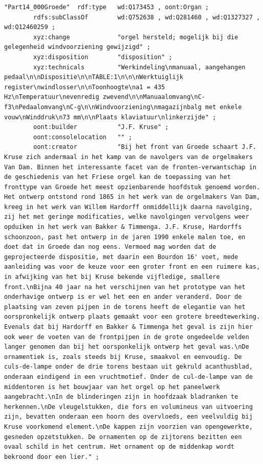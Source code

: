 \begin{lstlisting}[caption={Part14\_000Groede}]
"Part14_000Groede"  rdf:type   wd:Q173453 , oont:Organ ;
        rdfs:subClassOf        wd:Q752638 , wd:Q281460 , wd:Q1327327 , wd:Q12460259 ;
        xyz:change             "orgel hersteld; mogelijk bij die gelegenheid windvoorziening gewijzigd" ;
        xyz:disposition        "disposition" ;
        xyz:technicals         "Werkindeling\nmanuaal, aangehangen pedaal\n\nDispositie\n\nTABLE:1\n\n\nWerktuiglijk register\nwindlosser\n\nToonhoogte\na1 = 435 Hz\nTemperatuur\nevenredig zwevend\n\nManuaalomvang\nC-f3\nPedaalomvang\nC-g\n\nWindvoorziening\nmagazijnbalg met enkele vouw\nWinddruk\n73 mm\n\nPlaats klaviatuur\nlinkerzijde" ;
        oont:builder           "J.F. Kruse" ;
        oont:consolelocation   "" ;
        oont:creator           "Bij het front van Groede schaart J.F. Kruse zich andermaal in het kamp van de navolgers van de orgelmakers Van Dam. Binnen het interessante facet van de fronten-verwantschap in de geschiedenis van het Friese orgel kan de toepassing van het fronttype van Groede het meest opzienbarende hoofdstuk genoemd worden. Het ontwerp ontstond rond 1865 in het werk van de orgelmakers Van Dam, kreeg in het werk van Willem Hardorff onmiddellijk daarna navolging, zij het met geringe modificaties, welke navolgingen vervolgens weer opduiken in het werk van Bakker & Timmenga. J.F. Kruse, Hardorffs schoonzoon, past het ontwerp in de jaren 1990 enkele malen toe, en doet dat in Groede dan nog eens. Vermoed mag worden dat de geprojecteerde dispositie, met daarin een Bourdon 16' voet, mede aanleiding was voor de keuze voor een groter front en een ruimere kas, in afwijking van het bij Kruse bekende vijfledige, smallere front.\nBijna 40 jaar na het verschijnen van het prototype van het onderhavige ontwerp is er wel het een en ander veranderd. Door de plaatsing van zeven pijpen in de torens heeft de elegantie van het oorspronkelijk ontwerp plaats gemaakt voor een grotere breedtewerking. Evenals dat bij Hardorff en Bakker & Timmenga het geval is zijn hier ook weer de voeten van de frontpijpen in de grote ongedeelde velden langer genomen dan bij het oorsponkelijk ontwerp het geval was.\nDe ornamentiek is, zoals steeds bij Kruse, smaakvol en eenvoudig. De culs-de-lampe onder de drie torens bestaan uit gekruld acanthusblad, onderaan eindigend in een vruchtmotief. Onder de cul-de-lampe van de middentoren is het bouwjaar van het orgel op het paneelwerk aangebracht.\nIn de blinderingen zijn in hoofdzaak bladranken te herkennen.\nDe vleugelstukken, die fors en volumineus van uitvoering zijn, bevatten onderaan een hoorn des overvloeds, een veelvuldig bij Kruse voorkomend element.\nDe kappen zijn voorzien van opengewerkte, gesneden opzetstukken. De ornamenten op de zijtorens bezitten een ovaal schild in het centrum. Het ornament op de middenkap wordt bekroond door een lier." ;

\end{lstlisting}
